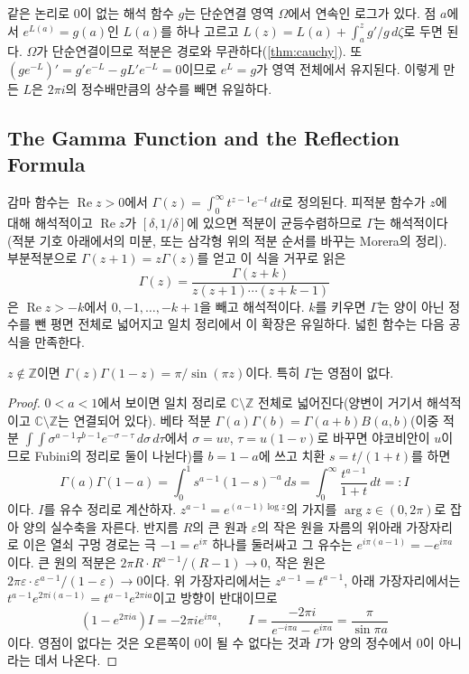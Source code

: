 같은 논리로 $0$이 없는 해석 함수 $g$는 단순연결 영역 $\Omega$에서 연속인 로그가 있다. 점 $a$에서 $e^{L(a)}=g(a)$인 $L(a)$를 하나 고르고 $L(z)=L(a)+\int_a^zg'/g\,d\zeta$로 두면 된다. $\Omega$가 단순연결이므로 적분은 경로와 무관하다(\cref{thm:cauchy}). 또 $(ge^{-L})'=g'e^{-L}-gL'e^{-L}=0$이므로 $e^L=g$가 영역 전체에서 유지된다. 이렇게 만든 $L$은 $2\pi i$의 정수배만큼의 상수를 빼면 유일하다.

\subsection{The Gamma Function and the Reflection Formula}

감마 함수는 $\operatorname{Re}z>0$에서 $\Gamma(z)=\int_0^\infty t^{z-1}e^{-t}\,dt$로 정의된다. 피적분 함수가 $z$에 대해 해석적이고 $\operatorname{Re}z$가 $[\delta,1/\delta]$에 있으면 적분이 균등수렴하므로 $\Gamma$는 해석적이다(적분 기호 아래에서의 미분, 또는 삼각형 위의 적분 순서를 바꾸는 Morera의 정리). 부분적분으로 $\Gamma(z+1)=z\Gamma(z)$를 얻고 이 식을 거꾸로 읽은
\[
\Gamma(z)=\frac{\Gamma(z+k)}{z(z+1)\cdots(z+k-1)}
\]
은 $\operatorname{Re}z>-k$에서 $0,-1,\dots,-k+1$을 빼고 해석적이다. $k$를 키우면 $\Gamma$는 양이 아닌 정수를 뺀 평면 전체로 넓어지고 일치 정리에서 이 확장은 유일하다. 넓힌 함수는 다음 공식을 만족한다.

\begin{theorem}[반사 공식]
\label{thm:reflection}
$z\notin\mathbb{Z}$이면 $\Gamma(z)\Gamma(1-z)=\pi/\sin(\pi z)$이다. 특히 $\Gamma$는 영점이 없다.
\end{theorem}

\begin{proof}
$0<a<1$에서 보이면 일치 정리로 $\mathbb{C}\setminus\mathbb{Z}$ 전체로 넓어진다(양변이 거기서 해석적이고 $\mathbb{C}\setminus\mathbb{Z}$는 연결되어 있다). 베타 적분 $\Gamma(a)\Gamma(b)=\Gamma(a+b)B(a,b)$(이중 적분 $\int\!\!\int\sigma^{a-1}\tau^{b-1}e^{-\sigma-\tau}\,d\sigma\,d\tau$에서 $\sigma=uv$, $\tau=u(1-v)$로 바꾸면 야코비안이 $u$이므로 Fubini의 정리로 둘이 나뉜다)를 $b=1-a$에 쓰고 치환 $s=t/(1+t)$를 하면
\[
\Gamma(a)\Gamma(1-a)=\int_0^1s^{a-1}(1-s)^{-a}\,ds=\int_0^\infty\frac{t^{a-1}}{1+t}\,dt=:I
\]
이다. $I$를 유수 정리로 계산하자. $z^{a-1}=e^{(a-1)\log z}$의 가지를 $\arg z\in(0,2\pi)$로 잡아 양의 실수축을 자른다. 반지름 $R$의 큰 원과 $\varepsilon$의 작은 원을 자름의 위아래 가장자리로 이은 열쇠 구멍 경로는 극 $-1=e^{i\pi}$ 하나를 둘러싸고 그 유수는 $e^{i\pi(a-1)}=-e^{i\pi a}$이다. 큰 원의 적분은 $2\pi R\cdot R^{a-1}/(R-1)\to0$, 작은 원은 $2\pi\varepsilon\cdot\varepsilon^{a-1}/(1-\varepsilon)\to0$이다. 위 가장자리에서는 $z^{a-1}=t^{a-1}$, 아래 가장자리에서는 $t^{a-1}e^{2\pi i(a-1)}=t^{a-1}e^{2\pi ia}$이고 방향이 반대이므로
\[
(1-e^{2\pi ia})I=-2\pi ie^{i\pi a},\qquad I=\frac{-2\pi i}{e^{-i\pi a}-e^{i\pi a}}=\frac{\pi}{\sin\pi a}
\]
이다. 영점이 없다는 것은 오른쪽이 $0$이 될 수 없다는 것과 $\Gamma$가 양의 정수에서 $0$이 아니라는 데서 나온다.
\end{proof}

